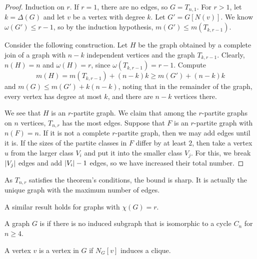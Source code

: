 \begin{proof}
  Induction on $r$.
  If $r = 1$, there are no edges, so $G = T_{n,1}$.
  For $r > 1$, let $k = \Delta(G)$ and let $v$ be a vertex with degree $k$.
  Let $G' = G[N(v)]$.
  We know $\omega(G') \le r-1$, so by the induction hypothesis, $m(G') \le
  m(T_{k,r-1})$.

  Consider the following construction.
  Let $H$ be the graph obtained by a complete join of a graph with $n-k$
  independent vertices and the graph $T_{k,r-1}$.
  Clearly, $n(H) = n$ and $\omega(H) = r$, since $\omega(T_{k,r-1}) = r-1$.
  Compute
  \[
	m(H) = m(T_{k,r-1}) + (n-k)k \ge m(G') + (n-k)k
  \]
  and $m(G) \le m(G') + k(n-k)$, noting that in the remainder of the graph,
  every vertex has degree at most $k$, and there are $n-k$ vertices there.

  We see that $H$ is an $r$-partite graph.
  We claim that among the $r$-partite graphs on $n$ vertices, $T_{n,r}$ has the
  most edges.
  Suppose that $F$ is an $r$-partite graph with $n(F) = n$.
  If it is not a complete $r$-partite graph, then we may add edges until it is.
  If the sizes of the partite classes in $F$ differ by at least $2$, then take a
  vertex $u$ from the larger class $V_i$ and put it into the smaller class
  $V_j$.
  For this, we break $\left| V_j \right|$ edges and add $\left| V_i \right|-1$ edges, so we have
  increased their total number.
\end{proof}


\begin{remark}
  As $T_{n,r}$ satisfies the theorem's conditions, the bound is sharp.
  It is actually the unique graph with the maximum number of edges.
\end{remark}

\begin{remark}
  A similar result holds for graphs with $\chi(G) = r$.
\end{remark}


\begin{definition}
  A graph $G$ is  if there is no induced subgraph that is
  isomorphic to a cycle $C_n$ for $n \ge 4$.
\end{definition}

\begin{definition}
  A vertex $v$ is a  vertex in $G$ if $N_G[v]$ induces a
  clique.
\end{definition}


